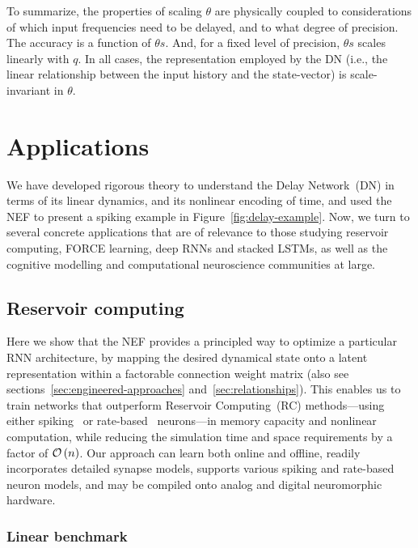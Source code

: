 To summarize, the properties of scaling $\theta$ are physically coupled to considerations of which input frequencies need to be delayed, and to what degree of precision.
The accuracy is a function of $\theta s$.
And, for a fixed level of precision, $\theta s$ scales linearly with $q$.
In all cases, the representation employed by the DN (i.e., the linear relationship between the input history and the state-vector) is scale-invariant in $\theta$.

\section{Applications}
\label{sec:delay-applications}

We have developed rigorous theory to understand the Delay Network~(DN) in terms of its linear dynamics, and its nonlinear encoding of time, and used the NEF to present a spiking example in Figure~\ref{fig:delay-example}.
Now, we turn to several concrete applications that are of relevance to those studying reservoir computing, FORCE learning, deep RNNs and stacked LSTMs, as well as the cognitive modelling and computational neuroscience communities at large.

\subsection{Reservoir computing}
\label{sec:delay-rc}

Here we show that the NEF provides a principled way to optimize a particular RNN architecture, by mapping the desired dynamical state onto a latent representation within a factorable connection weight matrix (also see sections~\ref{sec:engineered-approaches} and~\ref{sec:relationships}).
This enables us to train networks that outperform Reservoir Computing~(RC) methods---using either spiking~\citep[LSM;][]{maass2002real} or rate-based~\citep[ESN;][]{jaeger2001echo} neurons---in memory capacity and nonlinear computation, while reducing the simulation time and space requirements by a factor of $\mathcal{O}\left({n}\right)$.
Our approach can learn both online and offline, readily incorporates detailed synapse models, supports various spiking and rate-based neuron models, and may be compiled onto analog and digital neuromorphic hardware.

\subsubsection{Linear benchmark}


